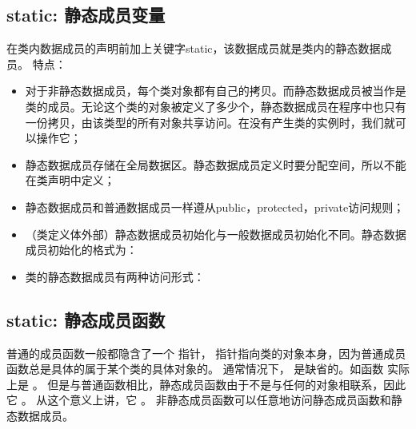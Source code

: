 \documentclass[letterpaper,10pt,english]{sphinxmanual}
\begin{document}
\subsection{static: 静态成员变量}
\label{\detokenize{cpp/14_staticExtern:id3}}
在类内数据成员的声明前加上关键字static，该数据成员就是类内的静态数据成员。
特点：
\begin{itemize}
\item {} 
对于非静态数据成员，每个类对象都有自己的拷贝。而静态数据成员被当作是类的成员。无论这个类的对象被定义了多少个，静态数据成员在程序中也只有一份拷贝，由该类型的所有对象共享访问。在没有产生类的实例时，我们就可以操作它；

\item {} 
静态数据成员存储在全局数据区。静态数据成员定义时要分配空间，所以不能在类声明中定义；

\item {} 
静态数据成员和普通数据成员一样遵从public，protected，private访问规则；

\item {} 
（类定义体外部）静态数据成员初始化与一般数据成员初始化不同。静态数据成员初始化的格式为：

\item {} 
类的静态数据成员有两种访问形式：

\end{itemize}


\subsection{static: 静态成员函数}
\label{\detokenize{cpp/14_staticExtern:id4}}
普通的成员函数一般都隐含了一个  指针，  指针指向类的对象本身，因为普通成员函数总是具体的属于某个类的具体对象的。
通常情况下，  是缺省的。如函数  实际上是  。
但是与普通函数相比，静态成员函数由于不是与任何的对象相联系，因此它  。
从这个意义上讲，它  。
非静态成员函数可以任意地访问静态成员函数和静态数据成员。
\end{document}
